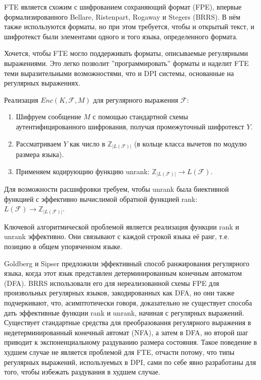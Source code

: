FTE является схожим с шифрованием сохраняющий формат (FPE), впервые формализированного Bellare, Ristenpart, Rogaway и Stegers (BRRS).
В нём также используются форматы, но при этом требуется, чтобы и открытый текст, и шифротекст были элементами одного и того языка, определенного формата.

Хочется, чтобы FTE могло поддерживать форматы, описываемые регулярными выражениями.
Это легко позволит ''программировать'' форматы и наделит FTE теми выразительными возможностями, что и DPI системы, основанные на регулярных выражениях.

Реализация $Enc(K, \mathcal{F}, M)$ для регулярного выражения $\mathcal{F}$:

\begin{enumerate}
    \item Шифруем сообщение $M$ с помощью стандартной схемы аутентифицированного шифрования, получая промежуточный шифротекст $Y$.
    \item Рассматриваем $Y$ как число в $\mathbb{Z}_{|L(\mathcal{F})|}$ (в кольце класса вычетов по модулю размера языка).
    \item Применяем кодирующию функцию unrank: $\mathbb{Z}_{|L(\mathcal{F})|} \rightarrow L(\mathcal{F})$.
\end{enumerate}


Для возможности расшифровки требуем, чтобы unrank была биективной функцией с эффективно вычислимой обратной функцией rank:
$L(\mathcal{F}) \rightarrow \mathbb{Z}_{|L(\mathcal{F})|}$.

Ключевой алгоритмической проблемой является реализация функции rank и unrank эффективно.
Они связывают с каждой строкой языка её ранг, т.е. позицию в общем упоряченном языке.

Goldberg и Sipser предложили эффективный способ ранжирования регулярного языка, когда этот язык представлен детерминированным конечным автоматом (DFA).
BRRS использовали его для нереализованной схемы FPE для произвольных регулярных языков, закодированных как DFA, но они также подчеркивают,
что, асимптотически говоря, доказательно не существует способа дать эффективные функции rank и unrank, начиная с регулярных выражений.
Существует стандартные средства для преобразования регулярного выражения в недетерминированный конечный автомат (NFA),
а затем в DFA, но второй шаг приводит к экспоненциальному раздуванию размера состояния.
Такое поведение в худшем случае не является проблемой для FTE, отчасти потому,
что типы регулярных выражений, используемых в DPI, сами по себе явно разработаны для того, чтобы избежать раздувания в худшем случае.


